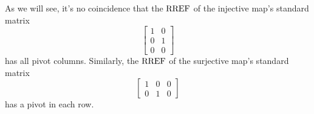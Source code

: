 


\begin{applicationActivities}

\begin{observation}
As we will see, it's no coincidence that the \(\operatorname{RREF}\) of the
injective map's standard matrix
\[
  \begin{bmatrix} 1 & 0 \\ 0 & 1 \\ 0 & 0 \end{bmatrix}
\]
has all pivot columns. Similarly, the \(\operatorname{RREF}\) of the surjective map's
standard matrix
\[
  \begin{bmatrix} 1 & 0 & 0 \\ 0 & 1 & 0 \end{bmatrix}
\]
has a pivot in each row.
\end{observation}


\end{applicationActivities}

